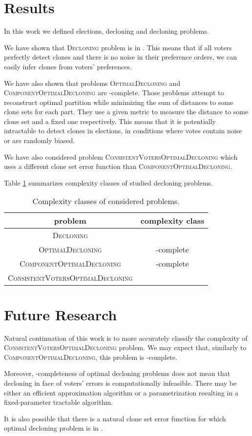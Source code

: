 \section{Results}

In this work we defined elections, decloning and decloning problems.

We have shown that \textsc{Decloning} problem is in \p.
This means that if all voters perfectly detect clones
and there is no noise in their preference orders,
we can easily infer clones from voters' preferences.

We have also shown that problems \textsc{OptimalDecloning} and \textsc{ComponentOptimalDecloning}
are \np-complete.
Those problems attempt to reconstruct optimal partition while minimizing 
the sum of distances to some clone sets for each part.
They use a given metric to measure the distance to some clone set and a fixed one respectively.
This means that it is potentially intractable to detect clones in elections,
in conditions where votes contain noise or are randomly biased.

We have also considered problem \textsc{ConsistentVotersOptimalDecloning}
which uses a different clone set error function than \textsc{ComponentOptimalDecloning}.

Table \ref{cclasses} summarizes complexity classes of studied decloning problems.

\begin{table}
\centering
\begin{tabular}{| c | c |}\hline
	\textbf{problem} & \textbf{complexity class} \\ \hline
	\textsc{Decloning} & \p \\ \hline
	\textsc{OptimalDecloning} & \np-complete \\ \hline
	\textsc{ComponentOptimalDecloning} & \np-complete \\ \hline
	\textsc{ConsistentVotersOptimalDecloning} & \np \\ \hline
\end{tabular}
\caption{Complexity classes of considered problems.} \label{cclasses}
\end{table}


\section{Future Research}

Natural continuation of this work is to more accurately classify the complexity of \textsc{ConsistentVotersOptimalDecloning} problem.
We may expect that, similarly to \textsc{ComponentOptimalDecloning}, this problem is \np-complete.

Moreover, \np-completeness of optimal decloning problems does not mean
that decloning in face of voters' errors is computationally infeasible.
There may be either an efficient approximation algorithm
or a parametrization resulting in a fixed-parameter tractable algorithm.

It is also possible that there is a natural clone set error function for which optimal decloning problem is in \p.
